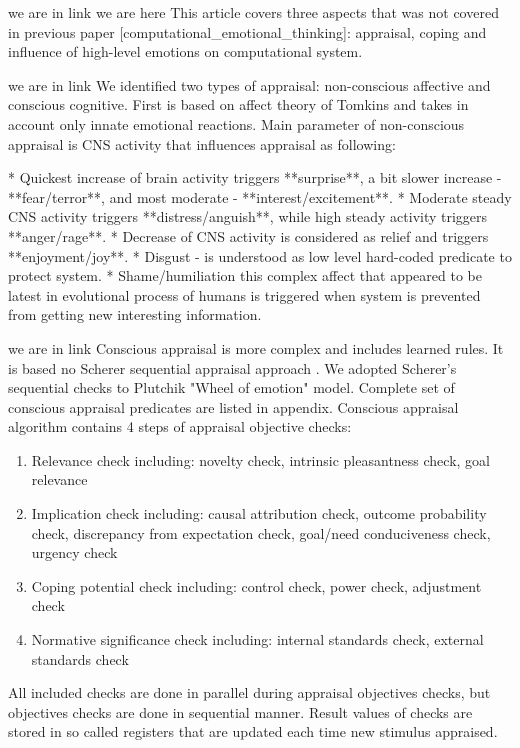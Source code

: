 we are in link
we are here This article covers three aspects that was not covered in previous paper [computational_emotional_thinking]: appraisal, coping and influence of high-level emotions on computational system.

we are in link
We identified two types of appraisal: non-conscious affective and conscious cognitive. First is based on affect theory of Tomkins \cite{primer_affect_psychology} and takes in account only innate emotional reactions. Main parameter of non-conscious appraisal is CNS activity that influences appraisal as following:

* Quickest increase of brain activity triggers **surprise**, a bit slower increase - **fear/terror**, and most moderate - **interest/excitement**.
* Moderate steady CNS activity triggers **distress/anguish**, while high steady activity triggers **anger/rage**.
* Decrease of CNS activity is considered as relief and triggers **enjoyment/joy**.
* Disgust - is understood as low level hard-coded predicate to protect system.
* Shame/humiliation this complex affect that appeared to be latest in evolutional process of humans is triggered when system is prevented from getting new interesting information.

we are in link
Conscious appraisal is more complex and includes learned rules. It is based no Scherer sequential appraisal approach \cite{appraisal_as_sequential_checking}. We adopted Scherer's sequential checks to Plutchik "Wheel of emotion" \cite{natureofemotions} model. Complete set of conscious appraisal predicates are listed in appendix. Conscious appraisal algorithm contains 4 steps of appraisal objective checks:

\begin{enumerate}
\item  Relevance check including: novelty check, intrinsic pleasantness check, goal relevance
\item  Implication check including: causal attribution check, outcome probability check, discrepancy from expectation check, goal/need conduciveness check, urgency check
\item  Coping potential check including: control check, power check, adjustment check
\item  Normative significance check including: internal standards check, external standards check
\end{enumerate}

All included checks are done in parallel during appraisal objectives checks, but objectives checks are done in sequential manner.
Result values of checks are stored in so called registers that are updated each time new stimulus appraised.


